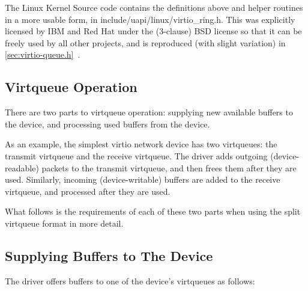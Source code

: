 The Linux Kernel Source code contains the definitions above and
helper routines in a more usable form, in
include/uapi/linux/virtio_ring.h. This was explicitly licensed by IBM
and Red Hat under the (3-clause) BSD license so that it can be
freely used by all other projects, and is reproduced (with slight
variation) in \ref{sec:virtio-queue.h}~.

\subsection{Virtqueue Operation}\label{sec:Basic Facilities of a Virtio Device / Virtqueues / Virtqueue Operation}

There are two parts to virtqueue operation: supplying new
available buffers to the device, and processing used buffers from
the device.

\begin{note} As an
example, the simplest virtio network device has two virtqueues: the
transmit virtqueue and the receive virtqueue. The driver adds
outgoing (device-readable) packets to the transmit virtqueue, and then
frees them after they are used. Similarly, incoming (device-writable)
buffers are added to the receive virtqueue, and processed after
they are used.
\end{note}

What follows is the requirements of each of these two parts
when using the split virtqueue format in more detail.

\subsection{Supplying Buffers to The Device}\label{sec:Basic Facilities of a Virtio Device / Virtqueues / Supplying Buffers to The Device}

The driver offers buffers to one of the device's virtqueues as follows:

